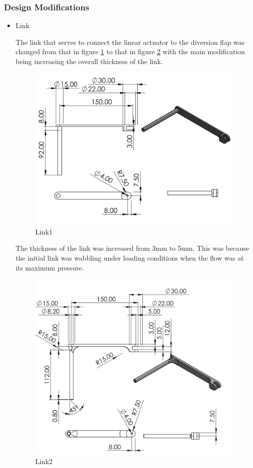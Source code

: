 \subsubsection{Design Modifications}
\begin{itemize}
    \item Link
\par
The link that serves to connect the linear actuator to the diversion flap was changed from that in figure \ref{fig: Link 1} to that in figure \ref{fig: Link 2} with the main modification being increasing the overall thickness of the link.
\begin{figure}[H]
        \centering
        \includegraphics [width=.8\textwidth] {Figures/RockerLink.jpg}
        \caption{Link1}
        \label{fig: Link 1}
        \end{figure}
The thickness of the link was increased from 3mm to 5mm. This was because the initial link was wabbling under loading conditions when the flow was at its maximum pressure.
        
        \begin{figure}[H]
        \centering
        \includegraphics {Figures/RockerLink2.JPG}
        \caption{Link2}
        \label{fig: Link 2}
        \end{figure}
\end{itemize}
